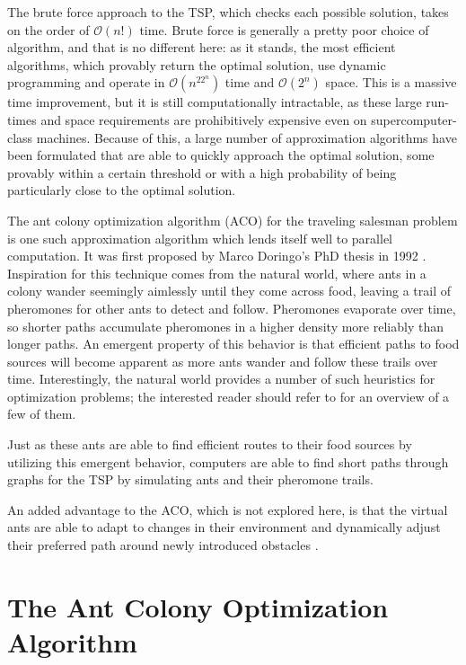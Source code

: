 \documentclass[twocolumn]{article}
\begin{document}
The brute force approach to the TSP, which checks each possible solution, takes 
on the order of $\mathcal{O}(n!)$ time. Brute force is generally a pretty poor choice of
algorithm, and that is no different here: as it stands, the most efficient 
algorithms, which provably return the optimal solution, use dynamic
programming and operate in $\mathcal{O}(n^22^n)$ time and $\mathcal{O}(2^n)$ space. 
This is a massive time improvement, but it is still computationally intractable, as 
these large run-times and space requirements are prohibitively expensive even on 
supercomputer-class machines. Because of this, a large number of approximation 
algorithms have been formulated that are able to quickly approach the optimal 
solution, some provably within a certain threshold or with a high probability of
being particularly close to the optimal solution.  

The ant colony optimization algorithm (ACO) for the traveling salesman problem 
is one such approximation algorithm which lends itself well to parallel 
computation. It was first proposed by Marco Doringo's PhD thesis in 1992 \cite{dorigo}. 
Inspiration for this technique comes from the natural world, where ants in a
colony wander seemingly aimlessly until they come across food, leaving
a trail of pheromones for other ants to detect and follow. Pheromones
evaporate over time, so shorter paths accumulate pheromones in a higher density 
more reliably than longer paths. An emergent property of this behavior is that 
efficient paths to food sources will become apparent as more ants wander and 
follow these trails over time. Interestingly, the natural world provides a number
of such heuristics for optimization problems; the interested reader should 
refer to \cite{nature} for an overview of a few of them. 

Just as these ants are able to find efficient routes to their food sources by
utilizing this emergent behavior, computers are able to find short paths through
graphs for the TSP by simulating ants and their pheromone trails. 

An added advantage to the ACO, which is not explored here, is that
the virtual ants are able to adapt to changes in their environment and 
dynamically adjust their preferred path around newly introduced obstacles 
\cite{iridia:aco}.

\section{The Ant Colony Optimization Algorithm} \label{sec:aco}
\end{document}
